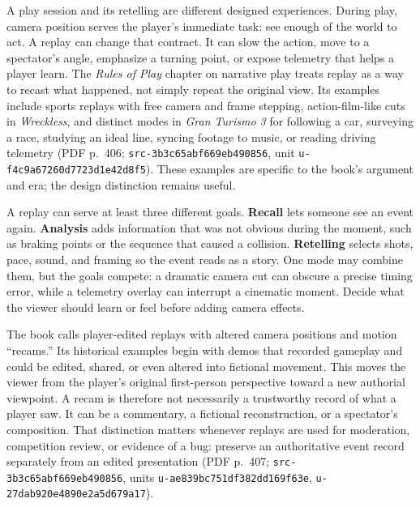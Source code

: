 \hypertarget{06-engine-ii-ch046-let-play-become-a-replayable-story}{}

A play session and its retelling are different designed experiences. During play, camera position serves the player's immediate task: see enough of the world to act. A replay can change that contract. It can slow the action, move to a spectator's angle, emphasize a turning point, or expose telemetry that helps a player learn. The \emph{Rules of Play} chapter on narrative play treats replay as a way to recast what happened, not simply repeat the original view. Its examples include sports replays with free camera and frame stepping, action-film-like cuts in \emph{Wreckless}, and distinct modes in \emph{Gran Turismo 3} for following a car, surveying a race, studying an ideal line, syncing footage to music, or reading driving telemetry (PDF p.~406; \texttt{src-3b3c65abf669eb490856}, unit \texttt{u-f4c9a67260d7723d1e42d8f5}). These examples are specific to the book's argument and era; the design distinction remains useful.

A replay can serve at least three different goals. \textbf{Recall} lets someone see an event again. \textbf{Analysis} adds information that was not obvious during the moment, such as braking points or the sequence that caused a collision. \textbf{Retelling} selects shots, pace, sound, and framing so the event reads as a story. One mode may combine them, but the goals compete: a dramatic camera cut can obscure a precise timing error, while a telemetry overlay can interrupt a cinematic moment. Decide what the viewer should learn or feel before adding camera effects.

The book calls player-edited replays with altered camera positions and motion ``recams.'' Its historical examples begin with demos that recorded gameplay and could be edited, shared, or even altered into fictional movement. This moves the viewer from the player's original first-person perspective toward a new authorial viewpoint. A recam is therefore not necessarily a trustworthy record of what a player saw. It can be a commentary, a fictional reconstruction, or a spectator's composition. That distinction matters whenever replays are used for moderation, competition review, or evidence of a bug: preserve an authoritative event record separately from an edited presentation (PDF p.~407; \texttt{src-3b3c65abf669eb490856}, units \texttt{u-ae839bc751df382dd169f63e}, \texttt{u-27dab920e4890e2a5d679a17}).

